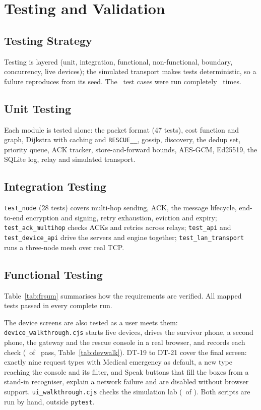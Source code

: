 \section{Testing and Validation}
\label{ch:test}



\begingroup\renewcommand{\arraystretch}{1.0}
\subsection{Testing Strategy}
Testing is layered (unit, integration, functional, non-functional, boundary, concurrency, live devices); the simulated transport makes tests deterministic, so a failure reproduces from its seed. The \NTests\ test cases were run completely \NRuns\ times. 

\subsection{Unit Testing}
Each module is tested alone: the packet format (47 tests), cost function and graph, Dijkstra with caching and \texttt{RESCUE\_\_}, gossip, discovery, the dedup set, priority queue, ACK tracker, store-and-forward bounds, AES-GCM, Ed25519, the SQLite log, relay and simulated transport.

\subsection{Integration Testing}
\texttt{test\_node} (28 tests) covers multi-hop sending, ACK, the message lifecycle, end-to-end encryption and signing, retry exhaustion, eviction and expiry; \texttt{test\_ack\_multihop} checks ACKs and retries across relays; \texttt{test\_api} and \texttt{test\_device\_api} drive the servers and engine together; \texttt{test\_lan\_transport} runs a three-node mesh over real TCP.
\subsection{Functional Testing}
\label{sec:func}
Table~\ref{tab:frsum} summarises how the requirements are verified.  All mapped tests passed in every complete run.


The device screens are also tested as a user meets them: \texttt{device\_walkthrough.cjs} starts five devices, drives the survivor phone, a second phone, the gateway and the rescue console in a real browser, and records each check (\NDevPass\ of \NDevChecks\ pass, Table~\ref{tab:devwalk}). DT-19 to DT-21 cover the final screen: exactly nine request types with Medical emergency as default, a new type reaching the console and its filter, and Speak buttons that fill the boxes from a stand-in recogniser, explain a network failure and are disabled without browser support. \texttt{ui\_walkthrough.cjs} checks the simulation lab (\NWebPass\ of \NWebChecks). Both scripts are run by hand, outside \texttt{pytest}.

